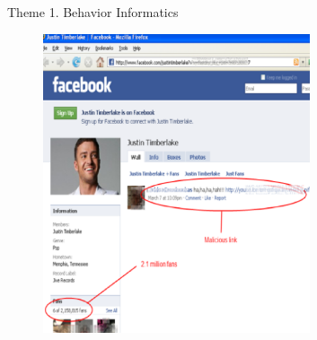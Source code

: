 \documentclass[
 size=14pt,
 paper=smartboard,  %
 mode=present, 		%
 display=slides, 	%
 pauseslide,
 fleqn,leqno]{powerdot}{}
\begin{document}
\begin{slide}{Theme 1. Behavior Informatics}
{\begin{figure}[htbp]
{    }
\end{figure}
}{
\begin{figure}[htbp]
    \includegraphics[width=0.7\textwidth]{figures//theme1//Theme1_7.eps}
\end{figure}
}

\end{slide}
\end{document}
